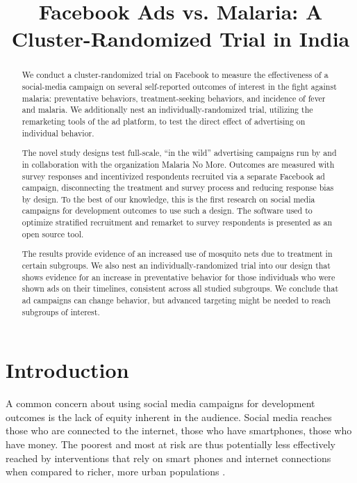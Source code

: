 \documentclass[a4paper,12pt]{article}
\title{Facebook Ads vs. Malaria: A Cluster-Randomized Trial in India}
\theoremstyle{proposition}
\begin{document}
\maketitle
 
\begin{abstract}
We conduct a cluster-randomized trial on Facebook to measure the effectiveness of a social-media campaign on several self-reported outcomes of interest in the fight against malaria: preventative behaviors, treatment-seeking behaviors, and incidence of fever and malaria. We additionally nest an individually-randomized trial, utilizing the remarketing tools of the ad platform, to test the direct effect of advertising on individual behavior.

The novel study designs test full-scale, ``in the wild'' advertising campaigns run by and in collaboration with the organization Malaria No More. Outcomes are measured with survey responses and incentivized respondents recruited via a separate Facebook ad campaign, disconnecting the treatment and survey process and reducing response bias by design. To the best of our knowledge, this is the first research on social media campaigns for development outcomes to use such a design. The software used to optimize stratified recruitment and remarket to survey respondents is presented as an open source tool.

The results provide evidence of an increased use of mosquito nets due to treatment in certain subgroups. We also nest an individually-randomized trial into our design that shows evidence for an increase in preventative behavior for those individuals who were shown ads on their timelines, consistent across all studied subgroups. We conclude that ad campaigns can change behavior, but advanced targeting might be needed to reach subgroups of interest.



\end{abstract}

\clearpage

\section{Introduction}

A common concern about using social media campaigns for development outcomes is the lack of equity inherent in the audience. Social media reaches those who are connected to the internet, those who have smartphones, those who have money. The poorest and most at risk are thus potentially less effectively reached by interventions that rely on smart phones and internet connections when compared to richer, more urban populations \cite{ref}.
\end{document}
